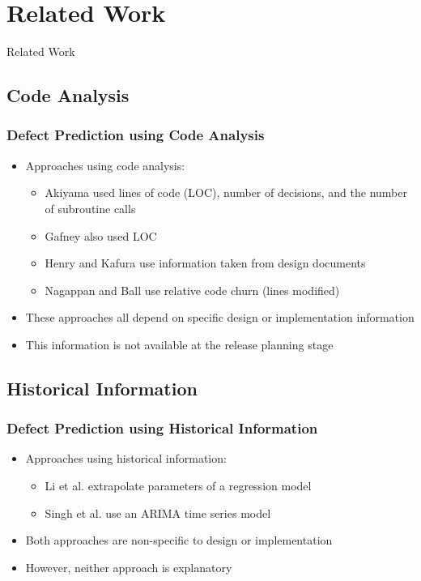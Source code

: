 \documentclass[presentation]{beamer}
\begin{document}
\section{Related Work}

\begin{frame}
\begin{center}
\Large{Related Work}
\end{center}
\end{frame}

\subsection{Code Analysis}

\begin{frame}[t]
\frametitle{Defect Prediction using Code Analysis}
\begin{itemize}
\item{Approaches using code analysis:
  \begin{itemize}
  \item{Akiyama used lines of code (LOC), number of decisions, and the number of subroutine calls \cite{1971_akiyama}}
  \item{Gafney also used LOC \cite{1984_gaffney_estimating}}
  \item{Henry and Kafura use information taken from design documents \cite{1984_henry_evaluation}}
  \item{Nagappan and Ball use relative code churn (lines modified) \cite{2005_nagappan_codechurn}}
  \end{itemize}
}
\item{These approaches all depend on specific design or implementation information}
\item{This information is not available at the release planning stage}
\end{itemize}
\end{frame}

\subsection{Historical Information}

\begin{frame}[t]
\frametitle{Defect Prediction using Historical Information}
\begin{itemize}
\item{Approaches using historical information:
  \begin{itemize}
  \item{Li et al. extrapolate parameters of a regression model \cite{2004_li_emperical_eval}}
  \item{Singh et al. use an ARIMA time series model \cite{2010_singh_predicting}}
  \end{itemize}
}
\item{Both approaches are non-specific to design or implementation}
\item{However, neither approach is explanatory}
\end{itemize}
\end{frame}
\end{document}
